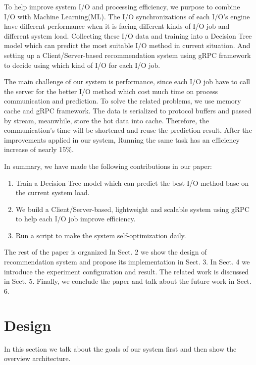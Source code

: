 \documentclass[conference]{IEEEtran}
\begin{document}
To help improve system I/O and processing efficiency, we purpose to combine I/O with Machine Learning(ML). The I/O synchronizations of each I/O's engine 
have different performance when it is facing different kinds of I/O job and different system load. Collecting these I/O data and training into a Decision Tree model 
which can predict the most suitable I/O method in current situation. And setting up a Client/Server-based recommendation system using gRPC framework to decide using which kind of I/O for each I/O job.


The main challenge of our system is performance, since each I/O job have to call the server for the better I/O method which cost much time on process communication and prediction.
To solve the related problems, we use memory cache and gRPC framework. The data is serialized to protocol buffers and passed by stream, meanwhile, store the hot data into cache.
Therefore, the communication's time will be shortened and reuse the prediction result. After the improvements applied in our system, Running the same task has an efficiency increase of nearly 15\%.

In summary, we have made the following contributions in our paper:
\begin{enumerate}
    \item Train a Decision Tree model which can predict the best I/O method base on the current system load.
    \item We build a Client/Server-based, lightweight and scalable system using gRPC to help each I/O job improve efficiency.
    \item Run a script to make the system self-optimization daily.
\end{enumerate}

The rest of the paper is organized In Sect. 2 we show the design
of recommendation system and propose its implementation in Sect. 3. In Sect. 4 we introduce
the experiment configuration and result. The related work is discussed in Sect.
5. Finally, we conclude the paper and talk about the future work in Sect. 6.



\section{Design}
In this section we talk about the goals of our system first and then show the overview architecture.
\end{document}
